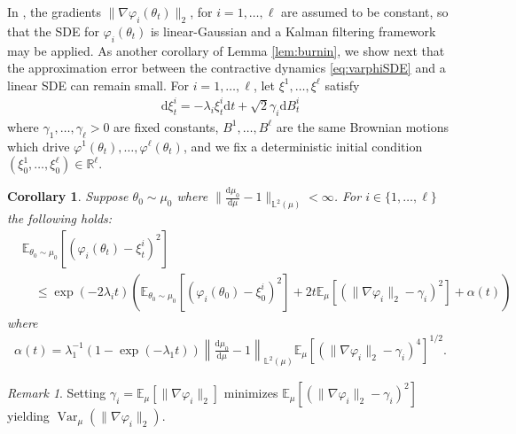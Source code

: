 \documentclass[11pt]{article}
\theoremstyle{plain}
\newtheorem{corollary}[theorem]{Corollary}
\theoremstyle{definition}
\theoremstyle{remark}
\newtheorem{remark}[theorem]{Remark}
\numberwithin{equation}{section}
\newcommand{\R}{\mathbb{R}}
\renewcommand{\d}{\mathrm{d}}
\newcommand{\lb}{\left}
\newcommand{\rb}{\right}
\newcommand{\bL}{\mathbb{L}}
\newcommand{\E}{\mathbb{E}}
\newcommand{\Var}{\operatorname{Var}}
\begin{document}
In \citet{shnitzer2020diffusion}, the gradients $\|\nabla \varphi_i(\theta_t)\|_2$, for $i=1,\dots,\ell$ are assumed to be constant, so that the SDE for $\varphi_i(\theta_t)$ is linear-Gaussian and a Kalman filtering framework may be applied. As another corollary of Lemma \ref{lem:burnin}, we show next that the approximation error between the contractive dynamics \eqref{eq:varphiSDE} and a linear SDE can remain small. For $i= 1,\dots,\ell$, let $\xi^1,\dots,\xi^\ell$ satisfy
\begin{align*}
\d \xi^i_t=-\lambda_i \xi^i_t \d t+\sqrt{2}\gamma_i\d B_t^i
\end{align*}
where $\gamma_1,\dots,\gamma_\ell>0$ are fixed constants, $B^1,\dots,B^\ell$ are the same Brownian motions which drive $\varphi^1(\theta_t),\dots,\varphi^\ell(\theta_t)$, and we fix a deterministic initial condition $(\xi^1_0,\dots,\xi^\ell_0)\in\R^\ell$.
\begin{corollary}
Suppose $\theta_0\sim \mu_0$ where $\|\frac{\d\mu_0}{\d\mu}-1\|_{\bL^2(\mu)}<\infty$.
For $i\in\{1,\dots,\ell\}$ the following holds:
\begin{equation}\label{eq:squarederror}
\begin{aligned}
&\E_{\theta_0\sim\mu_0}\lb[(\varphi_i(\theta_t)-\xi_t^i)^2\rb]\\
&\quad\le \exp(-2\lambda_i t)\lb(\E_{\theta_0\sim\mu_0}\lb[(\varphi_i(\theta_0)-\xi_0^i)^2\rb]+2t\E_{\mu}\lb[\lb( \|\nabla \varphi_i\|_2-\gamma_i\rb)^2\rb]+\alpha(t)\rb)
\end{aligned}
\end{equation}
where
\begin{align*}
\alpha(t)=\lambda_1^{-1}\lb(1-\exp(-\lambda_1 t)\rb)\lb\|\frac{\d\mu_0}{\d\mu}-1\rb\|_{\bL^2(\mu)}\E_{\mu}\lb[\lb( \|\nabla \varphi_i\|_2-\gamma_i\rb)^{4}\rb]^{1/2}.
\end{align*}
\end{corollary}
\begin{remark}
Setting $\gamma_i=\E_\mu[\|\nabla \varphi_i\|_2]$ minimizes $\E_{\mu}\lb[\lb( \|\nabla \varphi_i\|_2-\gamma_i\rb)^2\rb]$ yielding $\Var_{\mu}\lb( \|\nabla \varphi_i\|_2\rb)$.
\end{remark}
\end{document}
